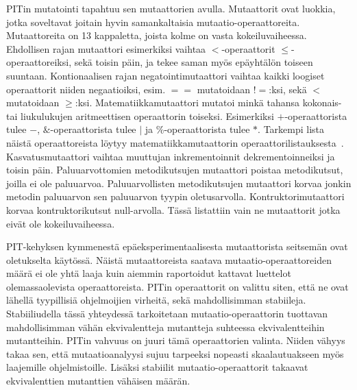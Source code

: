 \documentclass[finnish]{tktltiki2}
\begin{document}
PITin mutatointi tapahtuu sen mutaattorien avulla. Mutaattorit ovat luokkia, jotka soveltavat joitain hyvin samankaltaisia mutaatio-operaattoreita. Mutaattoreita on 13 kappaletta, joista kolme on vasta kokeiluvaiheessa. Ehdollisen rajan mutaattori esimerkiksi vaihtaa $<$-operaattorit $\leq$-operaattoreiksi, sekä toisin päin, ja tekee saman myös epäyhtälön toiseen suuntaan. Kontionaalisen rajan negatointimutaattori vaihtaa kaikki loogiset operaattorit niiden negaatioiksi, esim. $==$ mutatoidaan $!=$:ksi, sekä $<$ mutatoidaan $\geq$:ksi. Matematiikkamutaattori mutatoi minkä tahansa kokonais- tai liukulukujen aritmeettisen operaattorin toiseksi. Esimerkiksi $+$-operaattorista tulee $-$, $\&$-operaattorista tulee $|$ ja $\%$-operaattorista tulee $*$. Tarkempi lista näistä operaattoreista löytyy matematiikkamutaattorin operaattorilistauksesta~\cite{PITMathMutations}. Kasvatusmutaattori vaihtaa muuttujan inkrementoinnit dekrementoinneiksi ja toisin päin. Paluuarvottomien metodikutsujen mutaattori poistaa metodikutsut, joilla ei ole paluuarvoa. Paluuarvollisten metodikutsujen mutaattori korvaa jonkin metodin paluuarvon sen paluuarvon tyypin oletusarvolla. Kontruktorimutaattori korvaa kontruktorikutsut null-arvolla. Tässä listattiin vain ne mutaattorit jotka eivät ole kokeiluvaiheessa.

PIT-kehyksen kymmenestä epäeksperimentaalisesta mutaattorista seitsemän ovat oletukselta käytössä. Näistä mutaattoreista saatava mutaatio-operaattoreiden määrä ei ole yhtä laaja kuin aiemmin raportoidut kattavat luettelot olemassaolevista operaattoreista. PITin operaattorit on valittu siten, että ne ovat lähellä tyypillisiä ohjelmoijien virheitä, sekä mahdollisimman stabiileja. Stabiiliudella tässä yhteydessä tarkoitetaan mutaatio-operaattorin tuottavan mahdollisimman vähän ekvivalentteja mutantteja suhteessa ekvivalentteihin mutantteihin. PITin vahvuus on juuri tämä operaattorien valinta. Niiden vähyys takaa sen, että mutaatioanalyysi sujuu tarpeeksi nopeasti skaalautuakseen myös laajemille ohjelmistoille. Lisäksi stabiilit mutaatio-operaattorit takaavat ekvivalenttien mutanttien vähäisen määrän.
\end{document}
